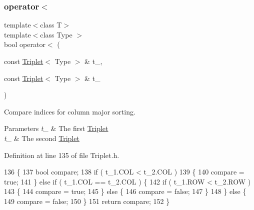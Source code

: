 \subsubsection{\texorpdfstring{operator$<$}{operator<}}
{\footnotesize\ttfamily template$<$class T$>$ \\
template$<$class Type $>$ \\
bool operator$<$ (\begin{DoxyParamCaption}\item[{const \hyperlink{classLuna_1_1Triplet}{Triplet}$<$ Type $>$ \&}]{t\+\_,  }\item[{const \hyperlink{classLuna_1_1Triplet}{Triplet}$<$ Type $>$ \&}]{t\+\_ }\end{DoxyParamCaption})\hspace{0.3cm}{\ttfamily [friend]}}



Compare indices for column major sorting. 


\begin{DoxyParams}{Parameters}
{\em t\+\_} & The first \hyperlink{classLuna_1_1Triplet}{Triplet} \\
\hline
{\em t\+\_} & The second \hyperlink{classLuna_1_1Triplet}{Triplet} \\
\hline
\end{DoxyParams}


Definition at line 135 of file Triplet.\+h.


\begin{DoxyCode}
136     \{
137         \textcolor{keywordtype}{bool} compare;
138         \textcolor{keywordflow}{if} ( t\_1.COL < t\_2.COL )
139         \{
140             compare = \textcolor{keyword}{true};
141         \} \textcolor{keywordflow}{else} \textcolor{keywordflow}{if} ( t\_1.COL == t\_2.COL ) \{
142             \textcolor{keywordflow}{if} ( t\_1.ROW < t\_2.ROW )
143             \{
144                 compare = \textcolor{keyword}{true};
145             \} \textcolor{keywordflow}{else} \{
146                 compare = \textcolor{keyword}{false};
147             \}
148         \} \textcolor{keywordflow}{else} \{
149             compare = \textcolor{keyword}{false};
150         \}
151         \textcolor{keywordflow}{return} compare;
152     \}
\end{DoxyCode}
\mbox{\label{classLuna_1_1Triplet_ad729c9b68955dcc5154d6bbd54a37a38}} 

